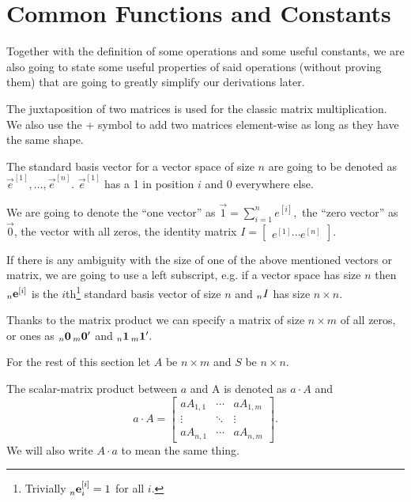 \documentclass{sapthesis}
\begin{document}
\section{Common Functions and Constants}

Together with the definition of some operations and some useful constants, we
are also going to state some useful properties of said operations (without
proving them) that are going to greatly simplify our derivations later.

The juxtaposition of two matrices is used for the classic matrix multiplication.
We also use the + symbol to add two matrices element-wise as long as they have
the same shape.

The standard basis vector for a vector space of size \(n\) are going to be
denoted as \(\vec e^{[1]},\ldots,\vec e^{[n]}.\) \(\vec e^{[1]}\) has a 1 in
position \(i\) and 0 everywhere else.

We are going to denote the ``one vector'' as \(\vec 1 = \sum_{i=1}^n e^{[i]},\)
the ``zero vector'' as \(\vec 0\), the vector with all zeros, the identity
matrix \(I = [\begin{array}{ccc}e^{[1]} \cdots e^{[n]}\end{array}]\).

If there is any ambiguity with the size of one of the above mentioned vectors or
matrix, we are going to use a left subscript, e.g. if a vector space has size
\(n\) then \(\leftidx{_n}{\vec e}{^{[i]}}\) is the \(i\)th\footnote{Trivially
\(\leftidx{_n^{\vphantom{^{[i]}}}}{\vec e}{^{[i]}_i} = 1\) for all \(i.\)}
standard basis vector of size \(n\) and \(\leftidx{_n}I{}\) has size \(n \times
n.\) 

Thanks to the matrix product we can specify a matrix of size \(n \times m\) of
all zeros, or ones as \(\cmat 0 n m\) and \(\cmat 1 n m.\)

For the rest of this section let \(A\) be \(n \times m\) and \(S\) be \(n \times
n.\)


The scalar-matrix product between \(a\) and A is denoted as \(a \cdot A\) and \[
a \cdot A = \left[\begin{array}{ccc}
    a A_{1,1} & \cdots & a A_{1,m} \\
    \vdots & \ddots & \vdots \\
    a A_{n,1} & \cdots & a A_{n,m}
\end{array}\right].
\] We will also write \(A \cdot a\) to mean the same thing.
\end{document}

